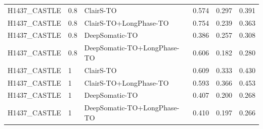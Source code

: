 \documentclass[pdflatex,sn-nature]{sn-jnl}
\begin{document}
{\begin{longtable}{@{}lllccc@{}}
  H1437\_CASTLE & 0.8 & ClairS-TO & 0.574 & 0.297 & 0.391 \\
  H1437\_CASTLE & 0.8 & ClairS-TO+LongPhase-TO & 0.754 & 0.239 & 0.363 \\
  H1437\_CASTLE & 0.8 & DeepSomatic-TO & 0.386 & 0.257 & 0.308 \\
  H1437\_CASTLE & 0.8 & DeepSomatic-TO+LongPhase-TO & 0.606 & 0.182 & 0.280 \\
  H1437\_CASTLE & 1 & ClairS-TO & 0.609 & 0.333 & 0.430 \\
  H1437\_CASTLE & 1 & ClairS-TO+LongPhase-TO & 0.593 & 0.366 & 0.453 \\
  H1437\_CASTLE & 1 & DeepSomatic-TO & 0.407 & 0.200 & 0.268 \\
  H1437\_CASTLE & 1 & DeepSomatic-TO+LongPhase-TO & 0.410 & 0.197 & 0.266 \\
\end{longtable}
}
\end{document}
